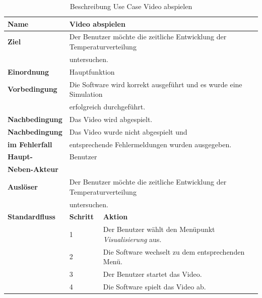 \begin{table} [H]
	\centering
	\begin{tabular}{|l|l|l|}
		\hline
		\textbf{Name} 			& \multicolumn{2}{|l|}{Video abspielen}  \\
		\hline
		\textbf{Ziel} 			& \multicolumn{2}{|l|}{Der Benutzer möchte die zeitliche Entwicklung der Temperaturverteilung  }\\ 
		& \multicolumn{2}{|l|}{untersuchen.}\\
		\hline
		\textbf{Einordnung}		& \multicolumn{2}{|l|}{Hauptfunktion}\\
		\hline
		\textbf{Vorbedingung}	& \multicolumn{2}{|l|}{Die Software wird korrekt ausgeführt und es wurde eine Simulation} \\
		& \multicolumn{2}{|l|}{ erfolgreich durchgeführt.} \\
		\hline
		\textbf{Nachbedingung}	& \multicolumn{2}{|l|}{Das Video wird abgespielt.}\\
		\hline
		\textbf{Nachbedingung} 	& \multicolumn{2}{|l|}{Das Video wurde nicht abgespielt und}\\
		\textbf{im Fehlerfall}	& \multicolumn{2}{|l|}{entsprechende Fehlermeldungen wurden ausgegeben.}\\
		\hline
		\textbf{Haupt-} 		& \multicolumn{2}{|l|}{Benutzer}\\
		\textbf{Neben-Akteur}	& \multicolumn{2}{|l|}{	}			\\
		\hline
		\textbf{Auslöser} 		& \multicolumn{2}{|l|}{Der Benutzer möchte die zeitliche Entwicklung der Temperaturverteilung} \\
		& \multicolumn{2}{|l|}{untersuchen.}\\
		\hline 
		\textbf{Standardfluss} & \textbf{Schritt} & \textbf{Aktion} \\
		\hline
		&	1	& Der Benutzer wählt den Menüpunkt \emph{Visualisierung} aus. \\
		\cline{2-3}
		&	2	& Die Software wechselt zu dem entsprechenden Menü.\\
		\cline{2-3}
		&	3	& Der Benutzer startet das Video.\\
		\cline{2-3}
		&	4	& Die Software spielt das Video ab.\\
		\hline
	\end{tabular}
	\caption{Beschreibung Use Case Video abspielen}
	\label{Beschreibung Use Case Video abspielen}
\end{table}

